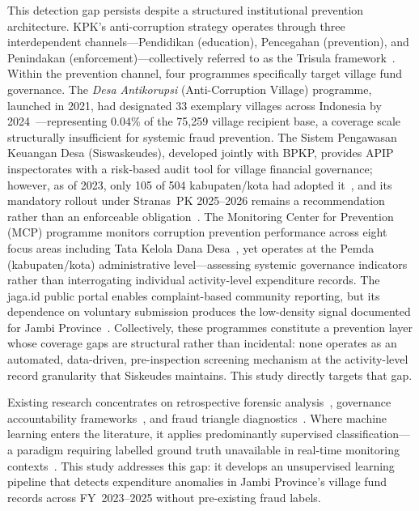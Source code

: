 \documentclass[3p,times,procedia]{elsarticle}
\begin{document}
This detection gap persists despite a structured institutional prevention architecture. KPK's anti-corruption strategy operates through three interdependent channels---Pendidikan (education), Pencegahan (prevention), and Penindakan (enforcement)---collectively referred to as the Trisula framework~\cite{ref4}. Within the prevention channel, four programmes specifically target village fund governance. The \textit{Desa Antikorupsi} (Anti-Corruption Village) programme, launched in 2021, had designated 33 exemplary villages across Indonesia by 2024~\cite{ref5}---representing 0.04\% of the 75,259 village recipient base, a coverage scale structurally insufficient for systemic fraud prevention. The Sistem Pengawasan Keuangan Desa (Siswaskeudes), developed jointly with BPKP, provides APIP inspectorates with a risk-based audit tool for village financial governance; however, as of 2023, only 105 of 504 kabupaten/kota had adopted it~\cite{ref6}, and its mandatory rollout under Stranas~PK 2025--2026 remains a recommendation rather than an enforceable obligation~\cite{ref7}. The Monitoring Center for Prevention (MCP) programme monitors corruption prevention performance across eight focus areas including Tata Kelola Dana Desa~\cite{ref8}, yet operates at the Pemda (kabupaten/kota) administrative level---assessing systemic governance indicators rather than interrogating individual activity-level expenditure records. The jaga.id public portal enables complaint-based community reporting, but its dependence on voluntary submission produces the low-density signal documented for Jambi Province~\cite{ref9}. Collectively, these programmes constitute a prevention layer whose coverage gaps are structural rather than incidental: none operates as an automated, data-driven, pre-inspection screening mechanism at the activity-level record granularity that Siskeudes maintains. This study directly targets that gap.

Existing research concentrates on retrospective forensic analysis~\cite{ref10}, governance accountability frameworks~\cite{ref11}, and fraud triangle diagnostics~\cite{ref12}. Where machine learning enters the literature, it applies predominantly supervised classification---a paradigm requiring labelled ground truth unavailable in real-time monitoring contexts~\cite{ref13,ref14}. This study addresses this gap: it develops an unsupervised learning pipeline that detects expenditure anomalies in Jambi Province's village fund records across FY~2023--2025 without pre-existing fraud labels.
\end{document}
